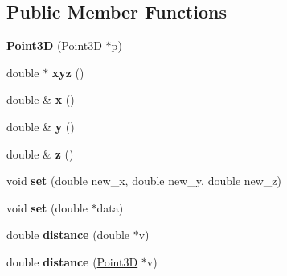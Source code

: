 \subsection*{Public Member Functions}
\begin{DoxyCompactItemize}
\item 
\hypertarget{classgeodesic_1_1_point3_d_af51b212e1c7783a152d051bfba01477d}{}{\bfseries Point3\+D} (\hyperlink{classgeodesic_1_1_point3_d}{Point3\+D} $\ast$p)\label{classgeodesic_1_1_point3_d_af51b212e1c7783a152d051bfba01477d}

\item 
\hypertarget{classgeodesic_1_1_point3_d_a6d17f1e0e0fec59ef52bdf57b15dcd45}{}double $\ast$ {\bfseries xyz} ()\label{classgeodesic_1_1_point3_d_a6d17f1e0e0fec59ef52bdf57b15dcd45}

\item 
\hypertarget{classgeodesic_1_1_point3_d_a1dcd0a527168c55641f24cd6f28dedd1}{}double \& {\bfseries x} ()\label{classgeodesic_1_1_point3_d_a1dcd0a527168c55641f24cd6f28dedd1}

\item 
\hypertarget{classgeodesic_1_1_point3_d_abd341931f55593d0fe5eb53b554ec000}{}double \& {\bfseries y} ()\label{classgeodesic_1_1_point3_d_abd341931f55593d0fe5eb53b554ec000}

\item 
\hypertarget{classgeodesic_1_1_point3_d_a98c3395b7346aecf1410076e0cfc00f3}{}double \& {\bfseries z} ()\label{classgeodesic_1_1_point3_d_a98c3395b7346aecf1410076e0cfc00f3}

\item 
\hypertarget{classgeodesic_1_1_point3_d_a09432372bbf3c0b1b3c867b30079eb9f}{}void {\bfseries set} (double new\+\_\+x, double new\+\_\+y, double new\+\_\+z)\label{classgeodesic_1_1_point3_d_a09432372bbf3c0b1b3c867b30079eb9f}

\item 
\hypertarget{classgeodesic_1_1_point3_d_a44c9221725a8d3ecd173639a61f846c4}{}void {\bfseries set} (double $\ast$data)\label{classgeodesic_1_1_point3_d_a44c9221725a8d3ecd173639a61f846c4}

\item 
\hypertarget{classgeodesic_1_1_point3_d_a1e9add700f5632bb84ca819f2f7dba9c}{}double {\bfseries distance} (double $\ast$v)\label{classgeodesic_1_1_point3_d_a1e9add700f5632bb84ca819f2f7dba9c}

\item 
\hypertarget{classgeodesic_1_1_point3_d_a818ba92398944178025b125b95761702}{}double {\bfseries distance} (\hyperlink{classgeodesic_1_1_point3_d}{Point3\+D} $\ast$v)\label{classgeodesic_1_1_point3_d_a818ba92398944178025b125b95761702}


\end{DoxyCompactItemize}
